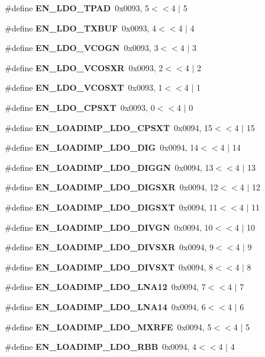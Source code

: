 \begin{DoxyCompactItemize}
\#define {\bf E\+N\+\_\+\+L\+D\+O\+\_\+\+T\+P\+AD}~0x0093, 5$<$$<$4 $\vert$  5
\item 
\#define {\bf E\+N\+\_\+\+L\+D\+O\+\_\+\+T\+X\+B\+UF}~0x0093, 4$<$$<$4 $\vert$  4
\item 
\#define {\bf E\+N\+\_\+\+L\+D\+O\+\_\+\+V\+C\+O\+GN}~0x0093, 3$<$$<$4 $\vert$  3
\item 
\#define {\bf E\+N\+\_\+\+L\+D\+O\+\_\+\+V\+C\+O\+S\+XR}~0x0093, 2$<$$<$4 $\vert$  2
\item 
\#define {\bf E\+N\+\_\+\+L\+D\+O\+\_\+\+V\+C\+O\+S\+XT}~0x0093, 1$<$$<$4 $\vert$  1
\item 
\#define {\bf E\+N\+\_\+\+L\+D\+O\+\_\+\+C\+P\+S\+XT}~0x0093, 0$<$$<$4 $\vert$  0
\item 
\#define {\bf E\+N\+\_\+\+L\+O\+A\+D\+I\+M\+P\+\_\+\+L\+D\+O\+\_\+\+C\+P\+S\+XT}~0x0094, 15$<$$<$4 $\vert$  15
\item 
\#define {\bf E\+N\+\_\+\+L\+O\+A\+D\+I\+M\+P\+\_\+\+L\+D\+O\+\_\+\+D\+IG}~0x0094, 14$<$$<$4 $\vert$  14
\item 
\#define {\bf E\+N\+\_\+\+L\+O\+A\+D\+I\+M\+P\+\_\+\+L\+D\+O\+\_\+\+D\+I\+G\+GN}~0x0094, 13$<$$<$4 $\vert$  13
\item 
\#define {\bf E\+N\+\_\+\+L\+O\+A\+D\+I\+M\+P\+\_\+\+L\+D\+O\+\_\+\+D\+I\+G\+S\+XR}~0x0094, 12$<$$<$4 $\vert$  12
\item 
\#define {\bf E\+N\+\_\+\+L\+O\+A\+D\+I\+M\+P\+\_\+\+L\+D\+O\+\_\+\+D\+I\+G\+S\+XT}~0x0094, 11$<$$<$4 $\vert$  11
\item 
\#define {\bf E\+N\+\_\+\+L\+O\+A\+D\+I\+M\+P\+\_\+\+L\+D\+O\+\_\+\+D\+I\+V\+GN}~0x0094, 10$<$$<$4 $\vert$  10
\item 
\#define {\bf E\+N\+\_\+\+L\+O\+A\+D\+I\+M\+P\+\_\+\+L\+D\+O\+\_\+\+D\+I\+V\+S\+XR}~0x0094, 9$<$$<$4 $\vert$  9
\item 
\#define {\bf E\+N\+\_\+\+L\+O\+A\+D\+I\+M\+P\+\_\+\+L\+D\+O\+\_\+\+D\+I\+V\+S\+XT}~0x0094, 8$<$$<$4 $\vert$  8
\item 
\#define {\bf E\+N\+\_\+\+L\+O\+A\+D\+I\+M\+P\+\_\+\+L\+D\+O\+\_\+\+L\+N\+A12}~0x0094, 7$<$$<$4 $\vert$  7
\item 
\#define {\bf E\+N\+\_\+\+L\+O\+A\+D\+I\+M\+P\+\_\+\+L\+D\+O\+\_\+\+L\+N\+A14}~0x0094, 6$<$$<$4 $\vert$  6
\item 
\#define {\bf E\+N\+\_\+\+L\+O\+A\+D\+I\+M\+P\+\_\+\+L\+D\+O\+\_\+\+M\+X\+R\+FE}~0x0094, 5$<$$<$4 $\vert$  5
\item 
\#define {\bf E\+N\+\_\+\+L\+O\+A\+D\+I\+M\+P\+\_\+\+L\+D\+O\+\_\+\+R\+BB}~0x0094, 4$<$$<$4 $\vert$  4

\end{DoxyCompactItemize}

